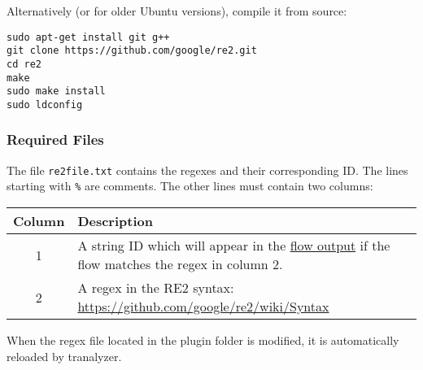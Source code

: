 \documentclass[documentation]{subfiles}
\begin{document}
Alternatively (or for older Ubuntu versions), compile it from source:
\begin{verbatim}
sudo apt-get install git g++
git clone https://github.com/google/re2.git
cd re2
make
sudo make install
sudo ldconfig
\end{verbatim}

\subsubsection{Required Files}
\label{re2RequiredFiles}
The file {\tt re2file.txt} contains the regexes and their corresponding ID.
The lines starting with {\tt \%} are comments. The other lines must contain two columns:
\begin{longtable}{cl}
    \toprule
    {\bf Column} & {\bf Description}\\
    \midrule\endhead%
    1 & A string ID which will appear in the \hyperref[re2FlowOutput]{flow output} if the flow matches
    the regex in column 2.\\
    2 & A regex in the RE2 syntax: \url{https://github.com/google/re2/wiki/Syntax}\\
    \bottomrule
\end{longtable}

When the regex file located in the plugin folder is modified, it is automatically reloaded by tranalyzer.
\end{document}

